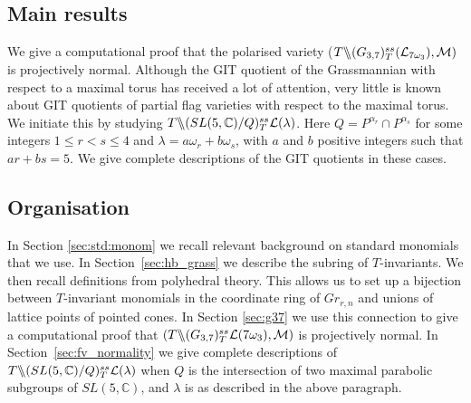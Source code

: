  \subsection{Main results}
We give a computational proof  that the polarised variety ($T \backslash\mkern-6mu\backslash (G_{{3},{7}})^{ss}_T{({\cal L}_{7\omega_3})}, {\cal M})$ is projectively normal.  
Although the GIT quotient of the Grassmannian with respect to a maximal torus has received a lot of attention, very little is known about GIT quotients of partial flag varieties with respect to the maximal torus. We initiate this by studying $T\backslash\mkern-6mu\backslash(SL(5, \mathbb{C})/Q)^{ss}_{T} {\mathcal L}(\lambda)$. Here $Q=P^{\alpha_{r}}\cap P^{\alpha_{s}}$ for some integers $1\leq r < s \leq 4$ and $\lambda=a\omega_r+b\omega_s$, with $a$ and $b$ positive integers such that $ar+bs=5$. 
We give complete descriptions of the GIT quotients in these cases.

\subsection{Organisation}
In Section \ref{sec:std:monom} we recall relevant background on standard monomials that we use.
In Section~\ref{sec:hb_grass} we describe the subring of $T$-invariants. We then recall definitions from polyhedral theory. This allows us to set up a bijection between $T$-invariant monomials in the coordinate ring of $Gr_{r,n}$ and unions of lattice points of pointed cones. In Section \ref{sec:g37} we use this connection to give a computational proof that $(T \backslash\mkern-6mu\backslash (G_{{3},{7}})^{ss}_T{\cal L}(7\omega_3), {\cal M})$  is projectively normal. In Section~\ref{sec:fv_normality} we give complete descriptions of  $T \backslash\mkern-6mu\backslash (SL(5,{\mathbb C}) / Q)^{ss}_{T}{\cal L}(\lambda)$ when $Q$ is the intersection of two maximal parabolic subgroups of $SL(5,{\mathbb C})$, and $\lambda$ is as described in the above paragraph.





